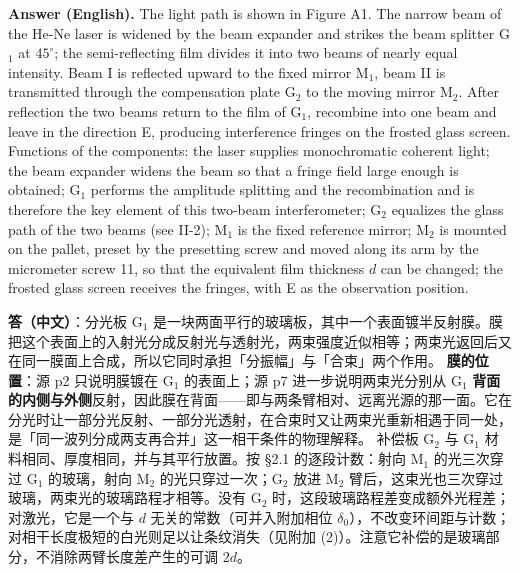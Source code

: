 \documentclass[11pt]{ctexart}
\newcommand{\Dl}{d}
\newcommand{\qaneed}[1]{\needspace{#1\textheight}}
\begin{document}
\textbf{Answer (English).} The light path is shown in Figure A1. The narrow beam of the He-Ne laser is widened by the beam expander and strikes the beam splitter G$_1$ at $45^\circ$; the semi-reflecting film divides it into two beams of nearly equal intensity. Beam I is reflected upward to the fixed mirror M$_1$, beam II is transmitted through the compensation plate G$_2$ to the moving mirror M$_2$. After reflection the two beams return to the film of G$_1$, recombine into one beam and leave in the direction E, producing interference fringes on the frosted glass screen.
Functions of the components: the laser supplies monochromatic coherent light; the beam expander widens the beam so that a fringe field large enough is obtained; G$_1$ performs the amplitude splitting and the recombination and is therefore the key element of this two-beam interferometer; G$_2$ equalizes the glass path of the two beams (see II-2); M$_1$ is the fixed reference mirror; M$_2$ is mounted on the pallet, preset by the presetting screw and moved along its arm by the micrometer screw 11, so that the equivalent film thickness $\Dl$ can be changed; the frosted glass screen receives the fringes, with E as the observation position.

\qaneed{0.68}


\textbf{答（中文）}：分光板 G$_1$ 是一块两面平行的玻璃板，其中一个表面镀半反射膜。膜把这个表面上的入射光分成反射光与透射光，两束强度近似相等；两束光返回后又在同一膜面上合成，所以它同时承担「分振幅」与「合束」两个作用。
\textbf{膜的位置}：源 p2 只说明膜镀在 G$_1$ 的表面上；源 p7 进一步说明两束光分别从 G$_1$ \textbf{背面的内侧与外侧}反射，因此膜在背面——即与两条臂相对、远离光源的那一面。它在分光时让一部分光反射、一部分光透射，在合束时又让两束光重新相遇于同一处，是「同一波列分成两支再合并」这一相干条件的物理解释。
补偿板 G$_2$ 与 G$_1$ 材料相同、厚度相同，并与其平行放置。按 §2.1 的逐段计数：射向 M$_1$ 的光三次穿过 G$_1$ 的玻璃，射向 M$_2$ 的光只穿过一次；G$_2$ 放进 M$_2$ 臂后，这束光也三次穿过玻璃，两束光的玻璃路程才相等。没有 G$_2$ 时，这段玻璃路程差变成额外光程差；对激光，它是一个与 $\Dl$ 无关的常数（可并入附加相位 $\delta_0$），不改变环间距与计数；对相干长度极短的白光则足以让条纹消失（见附加 (2)）。注意它补偿的是玻璃部分，不消除两臂长度差产生的可调 $2\Dl$。
\end{document}
